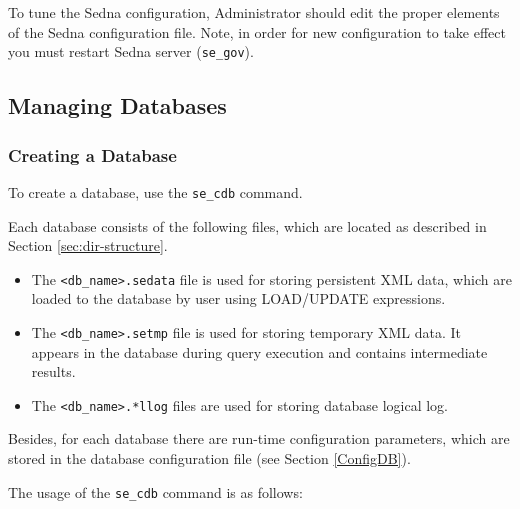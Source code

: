 \documentclass[a4paper,12pt]{article}
\begin{document}
To tune the Sedna configuration, Administrator should edit the proper elements of the Sedna configuration file. Note, in order for new configuration to take effect you must restart Sedna server (\verb!se_gov!).

\subsection{Managing Databases}
\subsubsection{Creating a Database}
\label{CreateDB}
To create a database, use the \verb!se_cdb! command.

Each database consists of the following files, which are located as described in Section \ref{sec:dir-structure}.

\begin{itemize}
\item The \verb!<db_name>.sedata! file is used for storing persistent XML data, which are loaded to the database by user using LOAD/UPDATE expressions.
\item The \verb!<db_name>.setmp! file is used for storing temporary XML data. It appears in the database during query execution and contains intermediate results.
\item The \verb!<db_name>.*llog! files are used for storing database logical log.
\end{itemize}

Besides, for each database there are run-time configuration parameters, which are stored in the database configuration file (see Section \ref{ConfigDB}).

The usage of the \verb!se_cdb! command is as follows:
\end{document}
